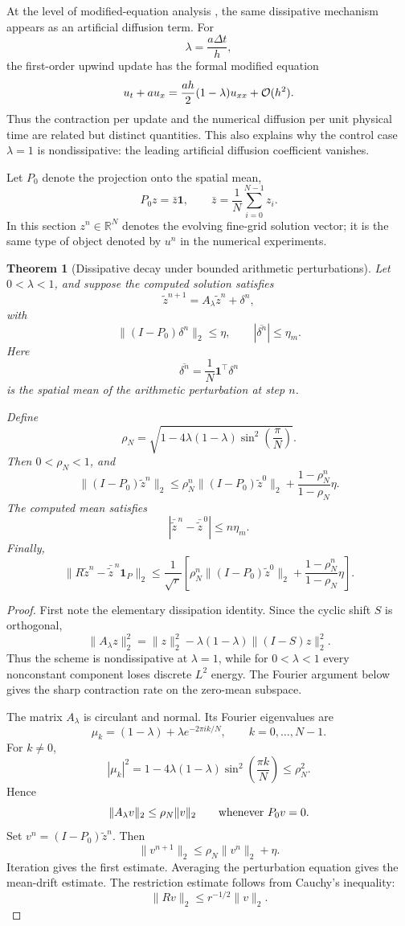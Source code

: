 \documentclass[pdflatex,sn-mathphys-num]{sn-jnl}%
\newtheorem{theorem}{Theorem}
\theoremstyle{thmstyleone}%
\theoremstyle{thmstyletwo}%
\theoremstyle{thmstylethree}%
\begin{document}
At the level of modified-equation analysis
\cite{warming1974,harten1983,tadmor1987,MargolinRider}, the same dissipative mechanism
appears as an artificial diffusion term.  For
\[
  \lambda=\frac{a\Delta t}{h},
\]
the first-order upwind update has the formal modified equation
\[
  u_t+a u_x
  =
  \frac{ah}{2}(1-\lambda)u_{xx}
  +
  {\cal O}(h^2).
\]
Thus the contraction per update and the numerical diffusion per unit
physical time are related but distinct quantities.  This also explains why
the control case \(\lambda=1\) is nondissipative: the leading artificial
diffusion coefficient vanishes.

Let \(P_0\) denote the projection onto the spatial mean,
\[
  P_0 z=\bar z\mathbf 1,
  \qquad
  \bar z=\frac1N\sum_{i=0}^{N-1}z_i.
\]
In this section \(z^n\in\mathbb R^N\) denotes the evolving fine-grid solution
vector; it is the same type of object denoted by \(u^n\) in the numerical
experiments.

\begin{theorem}[Dissipative decay under bounded arithmetic perturbations]
\label{thm:erasure}
Let \(0<\lambda<1\), and suppose the computed solution satisfies
\[
  \tilde z^{n+1}
  =
  A_\lambda \tilde z^n+\delta^n,
\]
with
\[
  \|(I-P_0)\delta^n\|_2\le\eta,
  \qquad
  |\overline{\delta^n}|\le\eta_m.
\]
Here
\[
  \overline{\delta^n}
  =
  \frac1N\mathbf 1^\top\delta^n
\]
is the spatial mean of the arithmetic perturbation at step \(n\).

Define
\[
  \rho_N
  =
  \sqrt{
  1-4\lambda(1-\lambda)\sin^2\left(\frac{\pi}{N}\right)
  }.
\]
Then \(0<\rho_N<1\), and
\[
  \|(I-P_0)\tilde z^n\|_2
  \le
  \rho_N^n\|(I-P_0)\tilde z^0\|_2
  +
  \frac{1-\rho_N^n}{1-\rho_N}\eta .
\]
The computed mean satisfies
\[
  |\bar{\tilde z}^{\,n}-\bar{\tilde z}^{\,0}|
  \le
  n\eta_m .
\]
Finally,
\[
  \|R\tilde z^n-\bar{\tilde z}^{\,n}\mathbf 1_P\|_2
  \le
  \frac1{\sqrt r}
  \left[
  \rho_N^n\|(I-P_0)\tilde z^0\|_2
  +
  \frac{1-\rho_N^n}{1-\rho_N}\eta
  \right].
\]
\end{theorem}

\begin{proof}
First note the elementary dissipation identity.  Since the cyclic shift
\(S\) is orthogonal,
\[
  \|A_\lambda z\|_2^2
  =
  \|z\|_2^2
  -
  \lambda(1-\lambda)\|(I-S)z\|_2^2.
\]
Thus the scheme is nondissipative at \(\lambda=1\), while for \(0<\lambda<1\) every nonconstant component loses discrete \(L^2\) energy.
The Fourier argument below gives the sharp contraction rate on the zero-mean subspace.

The matrix \(A_\lambda\) is circulant and normal.  Its Fourier eigenvalues
are
\[
  \mu_k=(1-\lambda)+\lambda e^{-2\pi i k/N},
  \qquad
  k=0,\ldots,N-1.
\]
For \(k\ne0\),
\[
  |\mu_k|^2
  =
  1-4\lambda(1-\lambda)\sin^2\left(\frac{\pi k}{N}\right)
  \le
  \rho_N^2.
\]
Hence
\[
  \|A_\lambda v\|_2\le \rho_N\|v\|_2
  \qquad
  \hbox{whenever }P_0 v=0.
\]
Set \(v^n=(I-P_0)\tilde z^n\).  Then
\[
  \|v^{n+1}\|_2
  \le
  \rho_N\|v^n\|_2+\eta .
\]
Iteration gives the first estimate.  Averaging the perturbation equation
gives the mean-drift estimate.  The restriction estimate follows from
Cauchy's inequality:
\[
  \|Rv\|_2\le r^{-1/2}\|v\|_2 .
\]
\end{proof}
\end{document}
